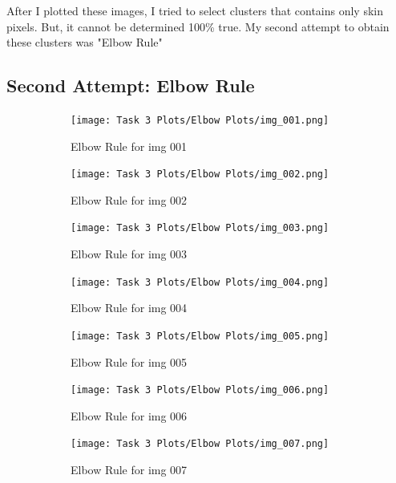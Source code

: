 \documentclass[11pt]{report}
\begin{document}
After I plotted these images, I tried to select clusters that contains only skin pixels. But, it cannot be determined 100\% true. My second attempt to obtain these clusters was "Elbow Rule"

\subsection{Second Attempt: Elbow Rule}
\begin{figure}[H]
    \centering
    \begin{subfigure}{0.3\textwidth}
        \centering
        \texttt{[image: Task 3 Plots/Elbow Plots/img\_001.png]}
        \caption{Elbow Rule for img 001}
        \label{fig:elbow1}
    \end{subfigure}
    \begin{subfigure}{0.3\textwidth}
        \centering
        \texttt{[image: Task 3 Plots/Elbow Plots/img\_002.png]}
        \caption{Elbow Rule for img 002}
        \label{fig:elbow2}
    \end{subfigure}
    \begin{subfigure}{0.3\textwidth}
        \centering
        \texttt{[image: Task 3 Plots/Elbow Plots/img\_003.png]}
        \caption{Elbow Rule for img 003}
        \label{fig:elbow3}
    \end{subfigure}
    \begin{subfigure}{0.3\textwidth}
        \centering
        \texttt{[image: Task 3 Plots/Elbow Plots/img\_004.png]}
        \caption{Elbow Rule for img 004}
        \label{fig:elbow4}
    \end{subfigure}
    \begin{subfigure}{0.3\textwidth}
        \centering
        \texttt{[image: Task 3 Plots/Elbow Plots/img\_005.png]}
        \caption{Elbow Rule for img 005}
        \label{fig:elbow5}
    \end{subfigure}
    \begin{subfigure}{0.3\textwidth}
        \centering
        \texttt{[image: Task 3 Plots/Elbow Plots/img\_006.png]}
        \caption{Elbow Rule for img 006}
        \label{fig:elbow6}
    \end{subfigure}
    \begin{subfigure}{0.3\textwidth}
        \centering
        \texttt{[image: Task 3 Plots/Elbow Plots/img\_007.png]}
        \caption{Elbow Rule for img 007}
        \label{fig:elbow7}
    \end{subfigure}
    \begin{subfigure}{0.3\textwidth}
        \centering

\end{subfigure}
\end{figure}
\end{document}
